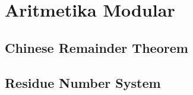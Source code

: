 \section{Aritmetika Modular}
\subsection{Chinese Remainder Theorem}
\subsection{Residue Number System}
